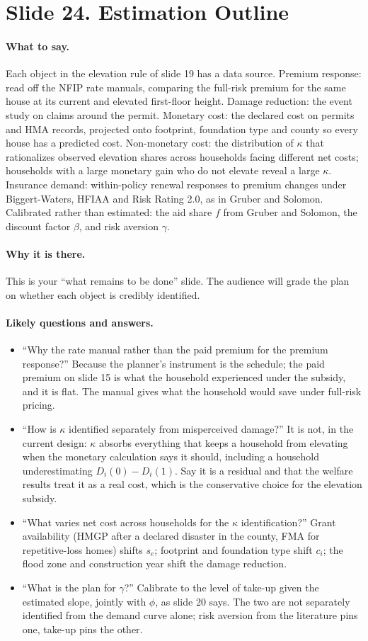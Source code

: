 \documentclass[11pt]{article}
\newcommand{\slide}[2]{\section*{Slide #1. #2}\addcontentsline{toc}{section}{Slide #1. #2}}
\newcommand{\say}{\paragraph{What to say.}}
\newcommand{\why}{\paragraph{Why it is there.}}
\newcommand{\qa}{\paragraph{Likely questions and answers.}}
\begin{document}
\slide{24}{Estimation Outline}
\say Each object in the elevation rule of slide 19 has a data source. Premium response: read off the NFIP rate manuals, comparing the full-risk premium for the same house at its current and elevated first-floor height. Damage reduction: the event study on claims around the permit. Monetary cost: the declared cost on permits and HMA records, projected onto footprint, foundation type and county so every house has a predicted cost. Non-monetary cost: the distribution of $\kappa$ that rationalizes observed elevation shares across households facing different net costs; households with a large monetary gain who do not elevate reveal a large $\kappa$. Insurance demand: within-policy renewal responses to premium changes under Biggert-Waters, HFIAA and Risk Rating 2.0, as in Gruber and Solomon. Calibrated rather than estimated: the aid share $f$ from Gruber and Solomon, the discount factor $\beta$, and risk aversion $\gamma$.

\why This is your ``what remains to be done'' slide. The audience will grade the plan on whether each object is credibly identified.

\qa
\begin{itemize}
\item ``Why the rate manual rather than the paid premium for the premium response?'' Because the planner's instrument is the schedule; the paid premium on slide 15 is what the household experienced under the subsidy, and it is flat. The manual gives what the household would save under full-risk pricing.
\item ``How is $\kappa$ identified separately from misperceived damage?'' It is not, in the current design: $\kappa$ absorbs everything that keeps a household from elevating when the monetary calculation says it should, including a household underestimating $D_i(0)-D_i(1)$. Say it is a residual and that the welfare results treat it as a real cost, which is the conservative choice for the elevation subsidy.
\item ``What varies net cost across households for the $\kappa$ identification?'' Grant availability (HMGP after a declared disaster in the county, FMA for repetitive-loss homes) shifts $s_e$; footprint and foundation type shift $c_i$; the flood zone and construction year shift the damage reduction.
\item ``What is the plan for $\gamma$?'' Calibrate to the level of take-up given the estimated slope, jointly with $\phi$, as slide 20 says. The two are not separately identified from the demand curve alone; risk aversion from the literature pins one, take-up pins the other.
\end{itemize}
\end{document}
